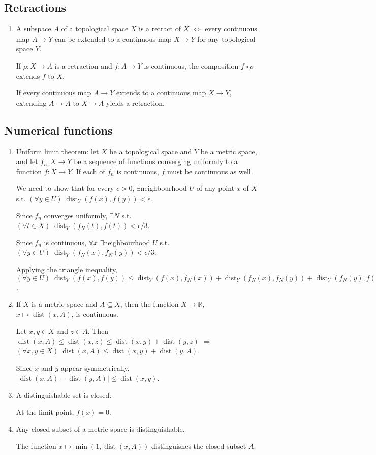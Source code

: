 \documentclass{article}
\DeclareMathOperator{\dist}{dist}
\begin{document}
\subsection{Retractions}
\begin{enumerate}
\item A subspace \(A\) of a topological space \(X\) is a retract of \(X\) \(\Longleftrightarrow\) every continuous map \(A\to Y\) can be extended to a continuous map \(X\to Y\) for any topological space \(Y\).

If \(\rho: X\to A\) is a retraction and \(f:A\to Y\) is continuous, the composition \(f\circ\rho\) extends \(f\) to \(X\).

If every continuous map \(A\to Y\) extends to a continuous map \(X\to Y\), extending \(A\to A\) to \(X\to A\) yields a retraction.
\end{enumerate}
\subsection{Numerical functions}
\begin{enumerate}
\item Uniform limit theorem: let \(X\) be a topological space and \(Y\) be a metric space, and let \(f_{n}:X\to Y\) be a sequence of functions converging uniformly to a function \(f:X\to Y\). If each of \(f_{n}\) is continuous, \(f\) must be continuous as well.

We need to show that for every \(\epsilon>0\), \(\exists\)neighbourhood \(U\) of any point \(x\) of \(X\) s.t. \((\forall y\in U)\;\dist_{Y}(f(x),f(y))<\epsilon\).

Since \(f_{n}\) converges uniformly, \(\exists N\) s.t. \((\forall t\in X)\;\dist_{Y}(f_{N}(t),f(t))<\epsilon/3\).

Since \(f_{n}\) is continuous, \(\forall x\) \(\exists\)neighbourhood \(U\) s.t. \((\forall y\in U)\;\dist_{Y}(f_{N}(x),f_{N}(y))<\epsilon/3\).

Applying the triangle inequality, \((\forall y\in U)\;\dist_{Y}(f(x),f(y))\le\dist_{Y}(f(x),f_{N}(x))+\dist_{Y}(f_{N}(x),f_{N}(y))+\dist_{Y}(f_{N}(y),f(y))=\epsilon\).
\item If \(X\) is a metric space and \(A\subseteq X\), then the function \(X\to \mathbb{R}\), \(x\mapsto \dist(x,A)\), is continuous.

Let \(x,y\in X\) and \(z\in A\). Then \(\dist(x,A)\le\dist(x,z)\le\dist(x,y)+\dist(y,z)\) \(\Longrightarrow\) \((\forall x,y\in X)\;\dist(x,A)\le\dist(x,y)+\dist(y,A)\).

Since \(x\) and \(y\) appear symmetrically, \(|\dist(x,A)-\dist(y,A)|\le\dist(x,y)\).
\item A distinguishable set is closed.

At the limit point, \(f(x)=0\).
\item Any closed subset of a metric space is distinguishable.

The function \(x\mapsto \min(1,\dist(x,A))\) distinguishes the closed subset \(A\).
\end{enumerate}
\end{document}

